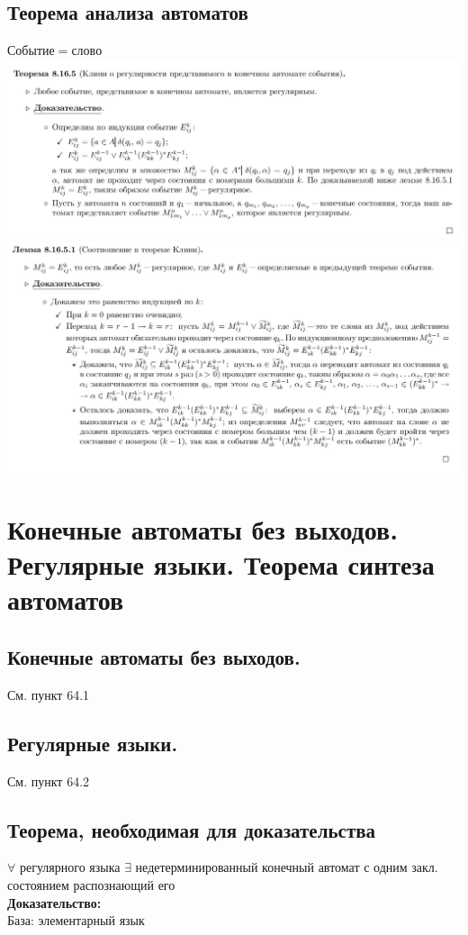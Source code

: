\documentclass[12pt]{article}
\begin{document}
\subsection{Теорема анализа автоматов}
	$Событие = слово$\\
	\includegraphics[width=550pt]{61}\\
	\includegraphics[width=550pt]{62}
	\qedsymbol

\section{Конечные автоматы без выходов. Регулярные языки. Теорема синтеза автоматов}
\subsection{Конечные автоматы без выходов.}
	См. пункт 64.1
\subsection{Регулярные языки.}
	См. пункт 64.2
\subsection{Теорема, необходимая для доказательства}
	$\forall$ регулярного языка $\exists$ недетерминированный конечный автомат с одним закл. состоянием распознающий его\\
	\textbf{Доказательство:}\\
	База: элементарный язык\\
\end{document}
